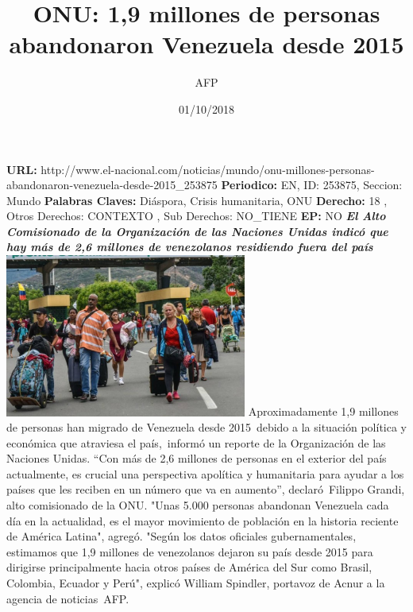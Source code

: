 \documentclass{article}%
\title{\textbf{ONU: 1,9 millones de personas abandonaron Venezuela desde 2015}}%
\author{AFP}%
\date{01/10/2018}%
\begin{document}
%
\normalsize%
\maketitle%
\textbf{URL: }%
http://www.el{-}nacional.com/noticias/mundo/onu{-}millones{-}personas{-}abandonaron{-}venezuela{-}desde{-}2015\_253875\newline%
%
\textbf{Periodico: }%
EN, %
ID: %
253875, %
Seccion: %
Mundo\newline%
%
\textbf{Palabras Claves: }%
Diáspora, Crisis humanitaria, ONU\newline%
%
\textbf{Derecho: }%
18%
, Otros Derechos: %
CONTEXTO%
, Sub Derechos: %
NO\_TIENE%
\newline%
%
\textbf{EP: }%
NO\newline%
\newline%
%
\textbf{\textit{El Alto Comisionado de la Organización de las Naciones Unidas indicó que hay más de 2,6 millones de venezolanos residiendo fuera del país}}%
\newline%
\newline%
%
\includegraphics[width=300px]{237.jpg}%
\newline%
%
Aproximadamente 1,9 millones de personas han migrado de Venezuela desde 2015~debido a la situación política y económica que atraviesa el país,~informó un reporte de la Organización de las Naciones Unidas.%
\newline%
%
“Con más de 2,6 millones de personas en el exterior del país actualmente, es crucial una perspectiva apolítica y humanitaria para ayudar a los países que les reciben en un número que va en aumento”, declaró~Filippo Grandi, alto comisionado de la ONU.%
\newline%
%
"Unas 5.000 personas abandonan Venezuela cada día en la actualidad, es el mayor movimiento de población en la historia reciente de América Latina", agregó.%
\newline%
%
"Según los datos oficiales gubernamentales, estimamos que 1,9 millones de venezolanos dejaron su país desde 2015 para dirigirse principalmente hacia otros países de América del Sur como Brasil, Colombia, Ecuador y Perú", explicó William Spindler, portavoz de Acnur a la agencia de noticias~AFP.%
\end{document}
